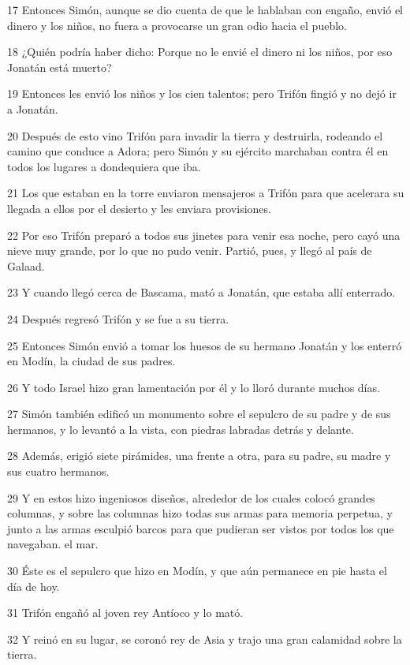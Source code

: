 \par 17 Entonces Simón, aunque se dio cuenta de que le hablaban con engaño, envió el dinero y los niños, no fuera a provocarse un gran odio hacia el pueblo.
\par 18 ¿Quién podría haber dicho: Porque no le envié el dinero ni los niños, por eso Jonatán está muerto?
\par 19 Entonces les envió los niños y los cien talentos; pero Trifón fingió y no dejó ir a Jonatán.
\par 20 Después de esto vino Trifón para invadir la tierra y destruirla, rodeando el camino que conduce a Adora; pero Simón y su ejército marchaban contra él en todos los lugares a dondequiera que iba.
\par 21 Los que estaban en la torre enviaron mensajeros a Trifón para que acelerara su llegada a ellos por el desierto y les enviara provisiones.
\par 22 Por eso Trifón preparó a todos sus jinetes para venir esa noche, pero cayó una nieve muy grande, por lo que no pudo venir. Partió, pues, y llegó al país de Galaad.
\par 23 Y cuando llegó cerca de Bascama, mató a Jonatán, que estaba allí enterrado.
\par 24 Después regresó Trifón y se fue a su tierra.
\par 25 Entonces Simón envió a tomar los huesos de su hermano Jonatán y los enterró en Modín, la ciudad de sus padres.
\par 26 Y todo Israel hizo gran lamentación por él y lo lloró durante muchos días.
\par 27 Simón también edificó un monumento sobre el sepulcro de su padre y de sus hermanos, y lo levantó a la vista, con piedras labradas detrás y delante.
\par 28 Además, erigió siete pirámides, una frente a otra, para su padre, su madre y sus cuatro hermanos.
\par 29 Y en estos hizo ingeniosos diseños, alrededor de los cuales colocó grandes columnas, y sobre las columnas hizo todas sus armas para memoria perpetua, y junto a las armas esculpió barcos para que pudieran ser vistos por todos los que navegaban. el mar.
\par 30 Éste es el sepulcro que hizo en Modín, y que aún permanece en pie hasta el día de hoy.
\par 31 Trifón engañó al joven rey Antíoco y lo mató.
\par 32 Y reinó en su lugar, se coronó rey de Asia y trajo una gran calamidad sobre la tierra.
